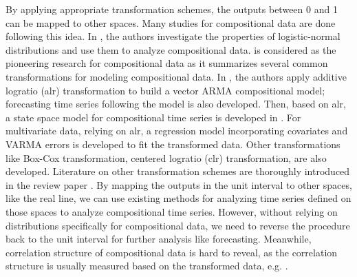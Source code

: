 \documentclass{article}
\theoremstyle{definition}
\begin{document}
By applying appropriate transformation schemes, the outputs between 0 and 1 can be mapped to other spaces. Many studies for compositional data are done following this idea. In \cite{atchison1980logistic}, the authors investigate the properties of logistic-normal distributions and use them to analyze compositional data. \cite{aitchison1982statistical} is considered as the pioneering research for compositional data as it summarizes several common transformations for modeling compositional data. In \cite{brunsdon1998time}, the authors apply additive logratio (alr) transformation to build a vector ARMA compositional model; forecasting time series following the model is also developed. Then, based on alr, a state space model for compositional time series is developed in \cite{silva2001modelling}. For multivariate data, relying on alr, a regression model incorporating covariates and VARMA errors is developed to fit the transformed data. Other transformations like Box-Cox transformation, centered logratio (clr) transformation, are also developed. Literature on other transformation schemes are thoroughly introduced in the review paper \cite{larrosa2017compositional}. By mapping the outputs in the unit interval to other spaces, like the real line, we can use existing methods for analyzing time series defined on those spaces to analyze compositional time series. However, without relying on distributions specifically for compositional data, we need to reverse the procedure back to the unit interval for further analysis like forecasting. Meanwhile, correlation structure of compositional data is hard to reveal, as the correlation structure is usually measured based on the transformed data, e.g. \cite{silva2001modelling}.
\end{document}

